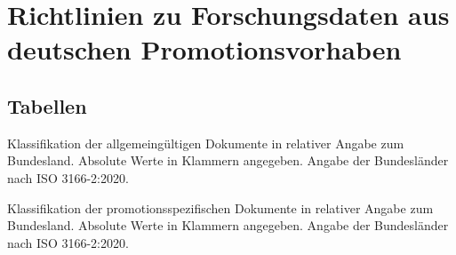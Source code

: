 \chapter{Richtlinien zu Forschungsdaten aus deutschen Promotionsvorhaben}\label{appendix:richtlinienklassifikation}
\section{Tabellen}
\begin{table}[!htbp]
	\caption{Klassifikation der allgemeingültigen Dokumente in relativer Angabe zum Bundesland.
	Absolute Werte in Klammern angegeben.
	Angabe der Bundesländer nach ISO 3166-2:2020.~\autocite{ISO3166}}
    
	\label{tab:stichprobe-klassifikation-allgemein-bundesland}
\end{table}

\newpage
\begin{table}[!htbp]
	\caption{Klassifikation der promotionsspezifischen Dokumente in relativer Angabe zum Bundesland.
	Absolute Werte in Klammern angegeben.
	Angabe der Bundesländer nach ISO 3166-2:2020.~\autocite{ISO3166}}
    
	\label{tab:stichprobe-klassifikation-spezifisch-bundesland}
\end{table}